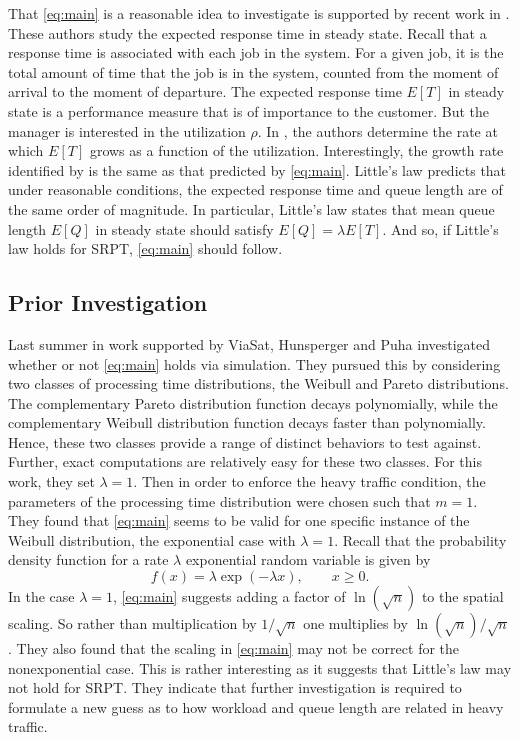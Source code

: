 \documentclass[12pt]{article}
\theoremstyle{plain}
\theoremstyle{definition}
\theoremstyle{remark}
\begin{document}
That \eqref{eq:main} is a reasonable idea to investigate is supported by recent work in \cite{lin11}.
These authors study the expected response time in steady state.  Recall that a response time is associated with each job in the system.
For a given job, it is the total amount of time that the job is in the system, counted from the moment of arrival to the moment of departure.  The expected response time $E[T]$ in steady state is a performance measure that is of importance to the customer.  But the manager is interested in the utilization $\rho$.  In \cite{lin11},
the authors determine the rate at which $E[T]$ grows as a function of the utilization. Interestingly, the growth
rate identified by \cite{lin11} is the same as that predicted by \eqref{eq:main}.  Little's law \cite{sti91} predicts that under reasonable conditions,
the expected response time and queue length are of the same order of magnitude. In particular, Little's law states that mean queue length $E[Q]$ in steady state should satisfy $E[Q] = \lambda E[T]$. And so, if Little's law holds for SRPT, \eqref{eq:main} should follow.

\subsection{Prior Investigation}

Last summer in work supported by ViaSat, Hunsperger and Puha \cite{puhahan12} investigated whether or not \eqref{eq:main} holds via simulation.  They pursued this by considering two classes of processing time distributions, the Weibull and Pareto distributions.  The complementary Pareto distribution function decays polynomially, while the complementary Weibull distribution function decays faster than polynomially.  Hence, these two classes provide a range of distinct behaviors to test against.  Further,  exact computations are relatively easy for these two classes.  For this work, they set $\lambda=1$.  Then in order to enforce the heavy traffic condition, the parameters of the processing time distribution were chosen such that $m=1$.
They found that \eqref{eq:main} seems to be valid for one specific instance of the Weibull distribution, the exponential case with $\lambda=1$.  Recall that the probability density function for a rate $\lambda$ exponential random variable is given by
$$
f(x)=\lambda \exp(-\lambda x),\qquad x\ge 0.
$$
In the case $\lambda=1$, \eqref{eq:main} suggests adding a factor of $\ln(\sqrt{n})$ to the spatial scaling.  So rather than multiplication by $1/\sqrt{n}$ one multiplies by $\ln(\sqrt{n})/\sqrt{n}$.  They also found that the scaling in \eqref{eq:main} may not be correct for the nonexponential case.  This is rather interesting as it suggests that Little's law may not hold for SRPT.  They indicate that further investigation is required to formulate a new guess as to how workload and queue length are related in heavy traffic.
\end{document}
